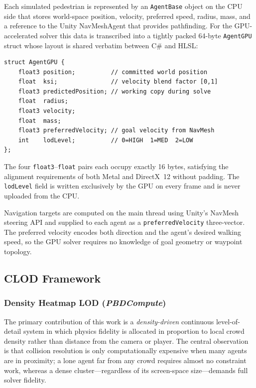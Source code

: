 Each simulated pedestrian is represented by an \texttt{AgentBase} object on
the CPU side that stores world-space position, velocity, preferred speed,
radius, mass, and a reference to the Unity NavMeshAgent that provides
pathfinding.  For the GPU-accelerated solver this data is transcribed into a
tightly packed 64-byte \texttt{AgentGPU} struct whose layout is shared
verbatim between C\# and HLSL:

\begin{verbatim}
struct AgentGPU {
    float3 position;          // committed world position
    float  ksi;               // velocity blend factor [0,1]
    float3 predictedPosition; // working copy during solve
    float  radius;
    float3 velocity;
    float  mass;
    float3 preferredVelocity; // goal velocity from NavMesh
    int    lodLevel;          // 0=HIGH  1=MED  2=LOW
};
\end{verbatim}

The four \texttt{float3}--\texttt{float} pairs each occupy exactly 16 bytes,
satisfying the alignment requirements of both Metal and DirectX~12 without
padding.  The \texttt{lodLevel} field is written exclusively by the GPU on
every frame and is never uploaded from the CPU.

Navigation targets are computed on the main thread using Unity's NavMesh
steering API and supplied to each agent as a \texttt{preferredVelocity}
three-vector.  The preferred velocity encodes both direction and the agent's
desired walking speed, so the GPU solver requires no knowledge of goal
geometry or waypoint topology.

\subsection{CLOD Framework}

\subsubsection{Density Heatmap LOD (\textit{PBDCompute})}
\label{sec:clod_density}

The primary contribution of this work is a \emph{density-driven} continuous
level-of-detail system in which physics fidelity is allocated in proportion to
local crowd density rather than distance from the camera or player.  The
central observation is that collision resolution is only computationally
expensive when many agents are in proximity; a lone agent far from any crowd
requires almost no constraint work, whereas a dense cluster---regardless of
its screen-space size---demands full solver fidelity.

